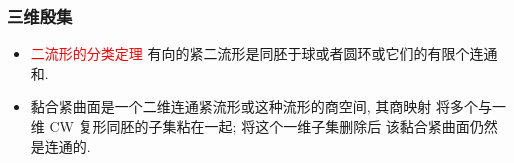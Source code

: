 \documentclass[UTF8]{ctexbeamer}	%
\theoremstyle{plain}
\theoremstyle{definition}
\theoremstyle{remark}
\numberwithin{equation}{section}
\begin{document}
\begin{frame}
    \frametitle{三维殷集}
    \begin{itemize}
        \item
              \textcolor{red}{二流形的分类定理} \newline
              有向的紧二流形是同胚于球或者圆环或它们的有限个连通和.
              \begin{figure}[!htb]
                \centering
                 \qquad
            \end{figure}


        \item 黏合紧曲面是一个二维连通紧流形或这种流形的商空间, 其商映射
              将多个与一维 CW 复形同胚的子集粘在一起; 将这个一维子集删除后
              该黏合紧曲面仍然是连通的.
    \end{itemize}
\end{frame}
\end{document}
